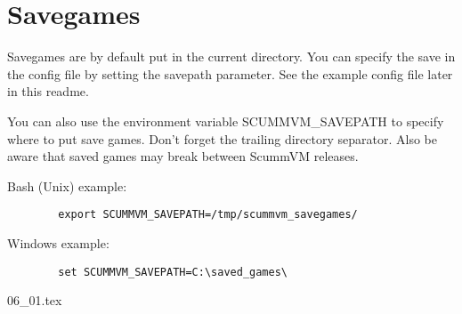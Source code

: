 \section {Savegames}
Savegames are by default put in the current directory. You can specify the save
in the config file by setting the savepath parameter. See the example config
file later in this readme.

You can also use the environment variable SCUMMVM\_SAVEPATH to specify where to
put save games. Don't forget the trailing directory separator. Also be aware
that saved games may break between ScummVM releases.

Bash (Unix) example:
\begin{verbatim}
        export SCUMMVM_SAVEPATH=/tmp/scummvm_savegames/
\end{verbatim}
Windows example:
\begin{verbatim}
        set SCUMMVM_SAVEPATH=C:\saved_games\
\end{verbatim}

 {06_01.tex}
